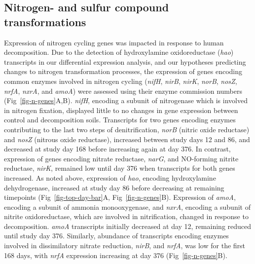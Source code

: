 \documentclass[
  sn-nature,
  lineno, referee]{sn-jnl}
\begin{document}
\subsection{Nitrogen- and sulfur compound
transformations}\label{nitrogen--and-sulfur-compound-transformations}

Expression of nitrogen cycling genes was impacted in response to human
decomposition. Due to the detection of hydroxylamine oxidoreductase
(\emph{hao}) transcripts in our differential expression analysis, and
our hypotheses predicting changes to nitrogen transformation processes,
the expression of genes encoding common enzymes involved in nitrogen
cycling (\emph{nifH}, \emph{nirB}, \emph{nirK}, \emph{norB},
\emph{nosZ}, \emph{nrfA}, \emph{nxrA}, and \emph{amoA}) were assessed
using their enzyme commission numbers (Fig~\ref{fig-n-genes}A,B).
\emph{nifH}, encoding a subunit of nitrogenase which is involved in
nitrogen fixation, displayed little to no changes in gene expression
between control and decomposition soils. Transcripts for two genes
encoding enzymes contributing to the last two steps of denitrification,
\emph{norB} (nitric oxide reductase) and \emph{nosZ} (nitrous oxide
reductase), increased between study days 12 and 86, and decreased at
study day 168 before increasing again at day 376. In contrast,
expression of genes encoding nitrate reductase, \emph{narG}, and
NO-forming nitrite reductase, \emph{nirK}, remained low until day 376
when transcripts for both genes increased. As noted above, expression of
\emph{hao}, encoding hydroxylamine dehydrogenase, increased at study day
86 before decreasing at remaining timepoints
(Fig~\ref{fig-top-day-bar}A, Fig~\ref{fig-n-genes}B). Expression of
\emph{amoA}, encoding a subunit of ammonia monooxygenase, and
\emph{nxrA}, encoding a subunit of nitrite oxidoreductase, which are
involved in nitrification, changed in response to decomposition.
\emph{amoA} transcripts initially decreased at day 12, remaining reduced
until study day 376. Similarly, abundance of transcripts encoding
enzymes involved in dissimilatory nitrate reduction, \emph{nirB}, and
\emph{nrfA}, was low for the first 168 days, with \emph{nrfA} expression
increasing at day 376 (Fig~\ref{fig-n-genes}B).
\end{document}
